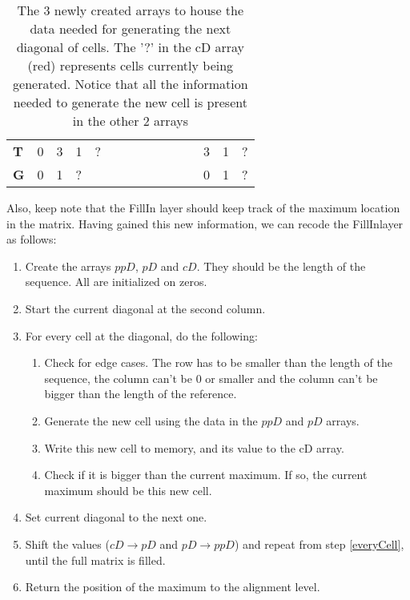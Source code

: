 \begin{table}[H]
\begin{tabular}{|l|lllllllllll|l|l|l|}
		\textbf{T}                      & 0                                 & \cellcolor[HTML]{9AFF99}3       & \cellcolor[HTML]{96FFFB}1       & \cellcolor[HTML]{FFCCC9}?       &                                 &                                 &                                 &                                 &                                 &                 &           & \cellcolor[HTML]{9AFF99}3 & \cellcolor[HTML]{96FFFB}1 & \cellcolor[HTML]{FFCCC9}? \\ \cline{1-1} \cline{13-15} 
		\textbf{G}                      & \cellcolor[HTML]{9AFF99}0         & \cellcolor[HTML]{96FFFB}1       & \cellcolor[HTML]{FFCCC9}?       &                                 &                                 &                                 &                                 &                                 &                                 &                 &           & \cellcolor[HTML]{9AFF99}0 & \cellcolor[HTML]{96FFFB}1 & \cellcolor[HTML]{FFCCC9}? \\ \cline{1-1} \cline{13-15} 
	\end{tabular}
	\caption{The 3 newly created arrays to house the data needed for generating the next diagonal of cells. The '?' in the cD array (red) represents cells currently being generated. Notice that all the information needed to generate the new cell is present in the other 2 arrays}
	\label{tbl:arraytable}
\end{table}

Also, keep note that the FillIn layer should keep track of the maximum location in the matrix. Having gained this new information, we can recode the FillInlayer as follows:

\begin{enumerate}
	\item Create the arrays $ppD$, $pD$ and $cD$. They should be the length of the sequence. All are initialized on zeros.
	\item Start the current diagonal at the second column.
	\item \label{everyCell}For every cell at the diagonal, do the following:
	\begin{enumerate}
		\item Check for edge cases. The row has to be smaller than the length of the sequence, the column can't be 0 or smaller and the column can't be bigger than the length of the reference.
		\item Generate the new cell using the data in the $ppD$ and $pD$ arrays.
		\item Write this new cell to memory, and its value to the cD array.
		\item Check if it is bigger than the current maximum. If so, the current maximum should be this new cell. 
	\end{enumerate}
	\item Set current diagonal to the next one.
	\item Shift the values ($cD \rightarrow pD$ and $pD \rightarrow ppD$) and repeat from step \ref{everyCell}, until the full matrix is filled.
	\item Return the position of the maximum to the alignment level.
\end{enumerate}

